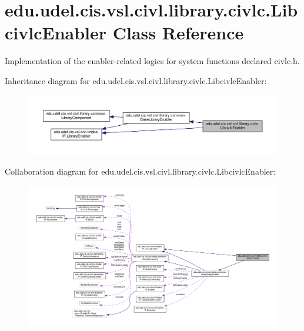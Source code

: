 \hypertarget{classedu_1_1udel_1_1cis_1_1vsl_1_1civl_1_1library_1_1civlc_1_1LibcivlcEnabler}{}\section{edu.\+udel.\+cis.\+vsl.\+civl.\+library.\+civlc.\+Libcivlc\+Enabler Class Reference}
\label{classedu_1_1udel_1_1cis_1_1vsl_1_1civl_1_1library_1_1civlc_1_1LibcivlcEnabler}


Implementation of the enabler-\/related logics for system functions declared civlc.\+h.  




Inheritance diagram for edu.\+udel.\+cis.\+vsl.\+civl.\+library.\+civlc.\+Libcivlc\+Enabler\+:
\nopagebreak
\begin{figure}[H]
\begin{center}
\leavevmode
\includegraphics[width=350pt]{classedu_1_1udel_1_1cis_1_1vsl_1_1civl_1_1library_1_1civlc_1_1LibcivlcEnabler__inherit__graph}
\end{center}
\end{figure}


Collaboration diagram for edu.\+udel.\+cis.\+vsl.\+civl.\+library.\+civlc.\+Libcivlc\+Enabler\+:
\nopagebreak
\begin{figure}[H]
\begin{center}
\leavevmode
\includegraphics[width=350pt]{classedu_1_1udel_1_1cis_1_1vsl_1_1civl_1_1library_1_1civlc_1_1LibcivlcEnabler__coll__graph}
\end{center}
\end{figure}
